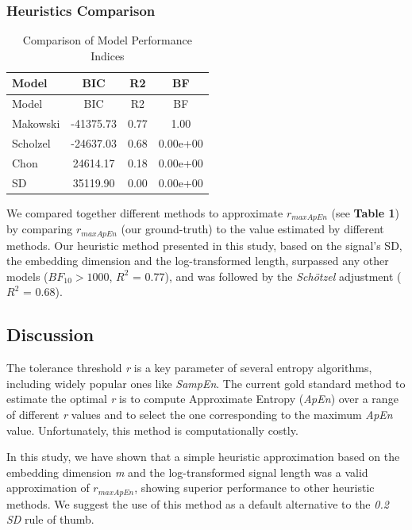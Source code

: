 \documentclass[
  man,floatsintext]{apa6}
\begin{document}
\hypertarget{heuristics-comparison}{%
\subsubsection{Heuristics Comparison}\label{heuristics-comparison}}

\begin{longtable}[]{@{}lccc@{}}
\caption{Comparison of Model Performance Indices}\tabularnewline
\toprule()
Model & BIC & R2 & BF \\
\midrule()
\endfirsthead
\toprule()
Model & BIC & R2 & BF \\
\midrule()
\endhead
Makowski & -41375.73 & 0.77 & 1.00 \\
Scholzel & -24637.03 & 0.68 & 0.00e+00 \\
Chon & 24614.17 & 0.18 & 0.00e+00 \\
SD & 35119.90 & 0.00 & 0.00e+00 \\
\bottomrule()
\end{longtable}

We compared together different methods to approximate \(r_{maxApEn}\) (see \textbf{Table 1}) by comparing \(r_{maxApEn}\) (our ground-truth) to the value estimated by different methods. Our heuristic method presented in this study, based on the signal's SD, the embedding dimension and the log-transformed length, surpassed any other models (\(BF_{10} > 1000\), \(R^2\) = 0.77), and was followed by the \emph{Schötzel} adjustment (\(R^2\) = 0.68).

\hypertarget{discussion}{%
\subsection{Discussion}\label{discussion}}

The tolerance threshold \emph{r} is a key parameter of several entropy algorithms, including widely popular ones like \emph{SampEn}. The current gold standard method to estimate the optimal \emph{r} is to compute Approximate Entropy (\emph{ApEn}) over a range of different \emph{r} values and to select the one corresponding to the maximum \emph{ApEn} value. Unfortunately, this method is computationally costly.

In this study, we have shown that a simple heuristic approximation based on the embedding dimension \emph{m} and the log-transformed signal length was a valid approximation of \(r_{maxApEn}\), showing superior performance to other heuristic methods.
We suggest the use of this method as a default alternative to the \emph{0.2 SD} rule of thumb.
\end{document}

